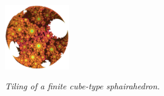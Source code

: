 \begin{figure}[H]
\begin{minipage}[t]{0.19\textwidth}
  \label{fig:sphaira-step10}
 \end{minipage}
 \hspace*{\fill}
 \begin{minipage}[t]{0.19\textwidth}
  \centering
  \includegraphics[width=1.1in, height=1.1in, keepaspectratio]{./img/application/sphairahedron/finiteProcess/final.png}
  \label{fig:sphaira-final}
 \end{minipage}
 \hspace*{\fill}
 \caption{\textit{Tiling of a finite cube-type sphairahedron.}}
 \label{fig:sphairahedronTile}
\end{figure}

